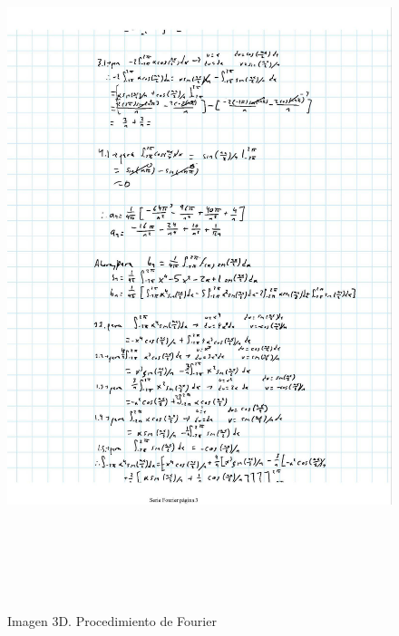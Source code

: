 \begin{figure}[H]
	\centering
	\includegraphics[width=6.26772in,height=8.11111in]{media/image55.jpg}
	\caption{Imagen 3D. Procedimiento de Fourier}
\end{figure}

